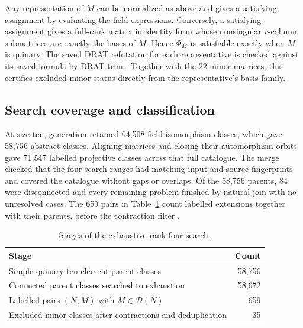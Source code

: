 \documentclass[11pt,letterpaper,titlepage]{article}
\begin{document}
Any representation of \(M\) can be normalized as above and gives a satisfying assignment by evaluating the field expressions. Conversely, a satisfying assignment gives a full-rank matrix in identity form whose nonsingular \(r\)-column submatrices are exactly the bases of \(M\). Hence \(\Phi_M\) is satisfiable exactly when \(M\) is quinary. The saved DRAT refutation for each representative is checked against its saved formula by DRAT-trim \cite{drat}. Together with the 22 minor matrices, this certifies excluded-minor status directly from the representative's basis family.

\subsection{Search coverage and classification}

At size ten, generation retained 64,508 field-isomorphism classes, which gave 58,756 abstract classes. Aligning matrices and closing their automorphism orbits gave 71,547 labelled projective classes across that full catalogue. The merge checked that the four search ranges had matching input and source fingerprints and covered the catalogue without gaps or overlaps. Of the 58,756 parents, 84 were disconnected and every remaining problem finished by natural join with no unresolved cases. The 659 pairs in Table~\ref{tab:enumeration} count labelled extensions together with their parents, before the contraction filter \cite{classification-paper,verification}.

\begin{table}[!htbp]
\centering
\caption{Stages of the exhaustive rank-four search.}
\label{tab:enumeration}
\begin{tabular}{@{}lr@{}}
\toprule
Stage & Count \\
\midrule
Simple quinary ten-element parent classes & 58,756 \\
Connected parent classes searched to exhaustion & 58,672 \\
Labelled pairs \((N,M)\) with \(M\in\mathcal{D}(N)\) & 659 \\
Excluded-minor classes after contractions and deduplication & 35 \\
\bottomrule
\end{tabular}
\end{table}
\end{document}

